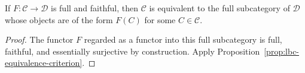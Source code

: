 \begin{corollary}
\label{cor:lbc-full-faithful-reflects-iso}
If $F:\mathcal C\to\mathcal D$ is full and faithful, then $\mathcal C$ is
equivalent to the full subcategory of $\mathcal D$ whose objects are of the
form $F(C)$ for some $C\in\mathcal C$.
\end{corollary}
\begin{proof}
The functor $F$ regarded as a functor into this full subcategory is full,
faithful, and essentially surjective by construction. Apply
Proposition~\ref{prop:lbc-equivalence-criterion}.
\end{proof}
